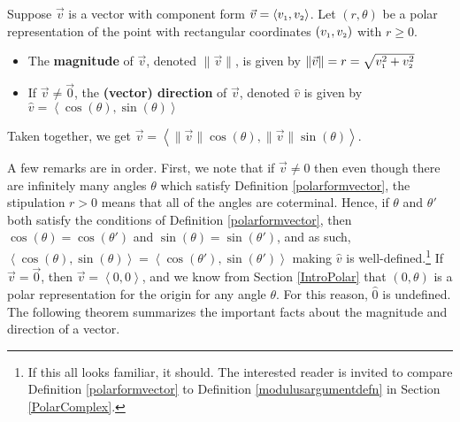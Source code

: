 \colorbox{ResultColor}{\bbm
\begin{defn} \label{polarformvector}  Suppose $\vec{v}$ is a vector with component form $\vec{v} =\left< v_{\mbox{\tiny $1$}} , v_{\mbox{\tiny $2$}}  \right>$.  Let $(r,\theta)$ be a polar representation of the point with rectangular coordinates $\left(v_{\mbox{\tiny $1$}} ,v_{\mbox{\tiny $2$}}  \right)$ with $r \geq 0$.
\begin{itemize}

\item  The  \textbf{magnitude} of $\vec{v}$, denoted $\| \vec{v} \|$, is given by $\| \vec{v} \| = r =   \sqrt{v_{\mbox{\tiny $1$}}^2 + v_{\mbox{\tiny $2$}}^2}$

\item If $\vec{v} \neq \vec{0}$,  the \textbf{(vector) direction} of $\vec{v}$, denoted $\hat{v}$ is given by  $\hat{v} = \left< \cos(\theta), \sin(\theta) \right>$

\end{itemize}

Taken together, we get $\vec{v} =  \left< \| \vec{v} \| \cos(\theta), \| \vec{v} \| \sin(\theta) \right>$.

\end{defn}
\ebm}

\smallskip

A few remarks are in order.   First, we note that if  $\vec{v} \neq 0$ then even though there are infinitely many angles $\theta$ which satisfy Definition \ref{polarformvector}, the stipulation $r>0$ means that all of the angles are coterminal.  Hence, if $\theta$ and $\theta'$ both satisfy the conditions of Definition \ref{polarformvector}, then $\cos(\theta) = \cos(\theta')$ and $\sin(\theta) = \sin(\theta')$, and as such, $ \left< \cos(\theta), \sin(\theta) \right> =  \left< \cos(\theta'), \sin(\theta') \right>$ making $\hat{v}$ is well-defined.\footnote{If this all looks familiar, it should. The interested reader is invited to compare Definition \ref{polarformvector} to Definition \ref{modulusargumentdefn} in Section \ref{PolarComplex}.}   If $\vec{v} = \vec{0}$, then $\vec{v} = \left< 0, 0 \right>$, and we know from Section \ref{IntroPolar} that $(0,\theta)$ is a polar representation for the origin for any angle $\theta$.  For this reason, $\hat{0}$ is undefined. The following theorem summarizes the important facts about the magnitude and direction of a vector.

\smallskip


